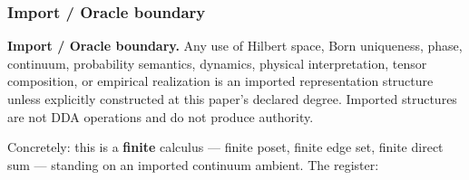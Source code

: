 \documentclass[
  11pt,
]{article}
\begin{document}
\subsubsection{Import / Oracle boundary}\label{import-oracle-boundary}

\textbf{Import / Oracle boundary.} Any use of Hilbert space, Born uniqueness, phase, continuum, probability semantics, dynamics, physical interpretation, tensor composition, or empirical realization is an imported representation structure unless explicitly constructed at this paper's declared degree. Imported structures are not DDA operations and do not produce authority.

Concretely: this is a \textbf{finite} calculus --- finite poset, finite edge set, finite direct sum --- standing on an imported continuum ambient. The register:
\end{document}
